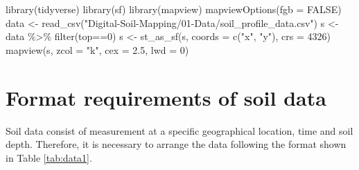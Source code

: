 \documentclass[
  10pt,
  b5paper,
  oneside]{book}
\newenvironment{Shaded}{\begin{snugshade}}{\end{snugshade}}
\newcommand{\AttributeTok}[1]{\textcolor[rgb]{0.77,0.63,0.00}{#1}}
\newcommand{\ConstantTok}[1]{\textcolor[rgb]{0.00,0.00,0.00}{#1}}
\newcommand{\DecValTok}[1]{\textcolor[rgb]{0.00,0.00,0.81}{#1}}
\newcommand{\FloatTok}[1]{\textcolor[rgb]{0.00,0.00,0.81}{#1}}
\newcommand{\FunctionTok}[1]{\textcolor[rgb]{0.00,0.00,0.00}{#1}}
\newcommand{\NormalTok}[1]{#1}
\newcommand{\OtherTok}[1]{\textcolor[rgb]{0.56,0.35,0.01}{#1}}
\newcommand{\SpecialCharTok}[1]{\textcolor[rgb]{0.00,0.00,0.00}{#1}}
\newcommand{\StringTok}[1]{\textcolor[rgb]{0.31,0.60,0.02}{#1}}
\begin{document}
\begin{Shaded}
\begin{Highlighting}[]
\FunctionTok{library}\NormalTok{(tidyverse)}
\FunctionTok{library}\NormalTok{(sf)}
\FunctionTok{library}\NormalTok{(mapview)}
\FunctionTok{mapviewOptions}\NormalTok{(}\AttributeTok{fgb =} \ConstantTok{FALSE}\NormalTok{)}
\NormalTok{data }\OtherTok{\textless{}{-}} \FunctionTok{read\_csv}\NormalTok{(}\StringTok{"Digital{-}Soil{-}Mapping/01{-}Data/soil\_profile\_data.csv"}\NormalTok{)}
\NormalTok{s }\OtherTok{\textless{}{-}}\NormalTok{ data }\SpecialCharTok{\%\textgreater{}\%} \FunctionTok{filter}\NormalTok{(top}\SpecialCharTok{==}\DecValTok{0}\NormalTok{)}
\NormalTok{s }\OtherTok{\textless{}{-}} \FunctionTok{st\_as\_sf}\NormalTok{(s, }\AttributeTok{coords =} \FunctionTok{c}\NormalTok{(}\StringTok{"x"}\NormalTok{, }\StringTok{"y"}\NormalTok{), }\AttributeTok{crs =} \DecValTok{4326}\NormalTok{)}
\FunctionTok{mapview}\NormalTok{(s, }\AttributeTok{zcol =} \StringTok{"k"}\NormalTok{, }\AttributeTok{cex =} \FloatTok{2.5}\NormalTok{, }\AttributeTok{lwd =} \DecValTok{0}\NormalTok{)}
\end{Highlighting}
\end{Shaded}

\hypertarget{preproc}{%
\section{Format requirements of soil data}\label{preproc}}

Soil data consist of measurement at a specific geographical location, time and soil depth. Therefore, it is necessary to arrange the data following the format shown in Table \ref{tab:data1}.
\end{document}
